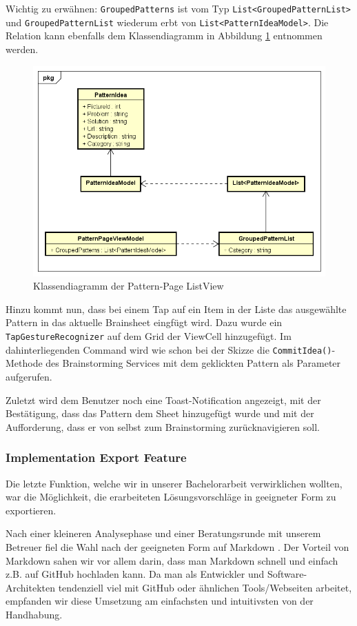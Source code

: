 Wichtig zu erwähnen: \texttt{GroupedPatterns} ist vom Typ \texttt{List<GroupedPatternList>} und \texttt{GroupedPatternList} wiederum erbt von \texttt{List<PatternIdeaModel>}. Die Relation kann ebenfalls dem Klassendiagramm in Abbildung \ref{fig:pattern-page-classdiagram} entnommen werden.
\begin{figure}[h]
	\centering
	\includegraphics[width=0.8\linewidth]{img/techn-bericht/pattern-page-classdiagram}
	\caption{Klassendiagramm der Pattern-Page ListView}
	\label{fig:pattern-page-classdiagram}
\end{figure}


Hinzu kommt nun, dass bei einem Tap auf ein Item in der Liste das ausgewählte Pattern in das aktuelle Brainsheet eingfügt wird. Dazu wurde ein \texttt{TapGestureRecognizer} auf dem Grid der ViewCell hinzugefügt. Im dahinterliegenden Command wird wie schon bei der Skizze die \texttt{CommitIdea()}-Methode des Brainstorming Services mit dem geklickten Pattern als Parameter aufgerufen. 

Zuletzt wird dem Benutzer noch eine Toast-Notification angezeigt, mit der Bestätigung, dass das Pattern dem Sheet hinzugefügt wurde und mit der Aufforderung, dass er von selbst zum Brainstorming zurücknavigieren soll.

\subsubsection{Implementation Export Feature}
Die letzte Funktion, welche wir in unserer Bachelorarbeit verwirklichen wollten, war die Möglichkeit, die erarbeiteten Lösungsvorschläge in geeigneter Form zu exportieren.

Nach einer kleineren Analysephase und einer Beratungsrunde mit unserem Betreuer fiel die Wahl nach der geeigneten Form auf Markdown \cite{markdown}. Der Vorteil von Markdown sahen wir vor allem darin, dass man Markdown schnell und einfach z.B. auf GitHub hochladen kann. Da man als Entwickler und Software-Architekten tendenziell viel mit GitHub oder ähnlichen Tools/Webseiten arbeitet, empfanden wir diese Umsetzung am  einfachsten und intuitivsten von der Handhabung.

